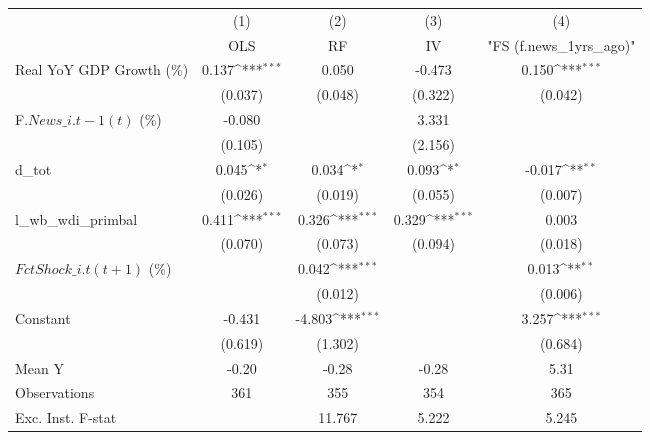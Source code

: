 {
\def\sym#1{\ifmmode^{#1}\else\(^{#1}\)\fi}
\begin{tabular}{l*{4}{c}}
\toprule
                    &\multicolumn{1}{c}{(1)}&\multicolumn{1}{c}{(2)}&\multicolumn{1}{c}{(3)}&\multicolumn{1}{c}{(4)}\\
                    &\multicolumn{1}{c}{OLS}&\multicolumn{1}{c}{RF}&\multicolumn{1}{c}{IV}&\multicolumn{1}{c}{ "FS (f.news\_1yrs\_ago)" }\\
\midrule
Real YoY GDP Growth (\%)&       0.137\sym{***}&       0.050         &      -0.473         &       0.150\sym{***}\\
                    &     (0.037)         &     (0.048)         &     (0.322)         &     (0.042)         \\
\addlinespace
F.$ News\_{i.t-1}(t)$ (\%)&      -0.080         &                     &       3.331         &                     \\
                    &     (0.105)         &                     &     (2.156)         &                     \\
\addlinespace
d\_tot               &       0.045\sym{*}  &       0.034\sym{*}  &       0.093\sym{*}  &      -0.017\sym{**} \\
                    &     (0.026)         &     (0.019)         &     (0.055)         &     (0.007)         \\
\addlinespace
l\_wb\_wdi\_primbal    &       0.411\sym{***}&       0.326\sym{***}&       0.329\sym{***}&       0.003         \\
                    &     (0.070)         &     (0.073)         &     (0.094)         &     (0.018)         \\
\addlinespace
$ FctShock\_{i.t}(t+1)$ (\%)&                     &       0.042\sym{***}&                     &       0.013\sym{**} \\
                    &                     &     (0.012)         &                     &     (0.006)         \\
\addlinespace
Constant            &      -0.431         &      -4.803\sym{***}&                     &       3.257\sym{***}\\
                    &     (0.619)         &     (1.302)         &                     &     (0.684)         \\
\midrule
Mean Y              &       -0.20         &       -0.28         &       -0.28         &        5.31         \\
Observations        &         361         &         355         &         354         &         365         \\
Exc. Inst. F-stat   &                     &      11.767         &       5.222         &       5.245         \\
\bottomrule
\end{tabular}
}
